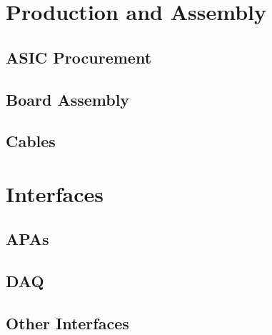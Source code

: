 \section{Production and Assembly}
\label{sec:fdsp-tpc-elec-prod}

\subsection{ASIC Procurement}
\label{sec:fdsp-tpc-elec-prod-asic}

\subsection{Board Assembly}
\label{sec:fdsp-tpc-elec-prod-board}

\subsection{Cables}
\label{sec:fdsp-tpc-elec-prod-cables}



\section{Interfaces}
\label{sec:fdsp-tpc-elec-intfc}



\subsection{APAs}
\label{sec:fdsp-tpc-elec-intfc-apa}

\subsection{DAQ}
\label{sec:fdsp-tpc-elec-intfc-daq}

\subsection{Other Interfaces}
\label{sec:fdsp-tpc-elec-intfc-other}



